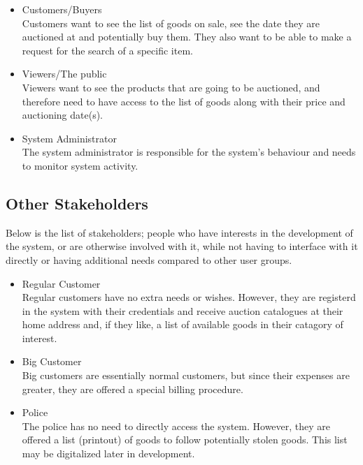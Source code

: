 \begin{itemize}[noitemsep]
	\item Customers/Buyers\\
		Customers want to see the list of goods on sale, see the date they are auctioned at and potentially buy them. They also want to be able to make a request for the search of a specific item.
	\item Viewers/The public\\
		Viewers want to see the products that are going to be auctioned, and therefore need to have access to the list of goods along with their price and auctioning date(s).
	\item System Administrator\\
		The system administrator is responsible for the system's behaviour and needs to monitor system activity.
\end{itemize}

\subsection{Other Stakeholders}
Below is the list of stakeholders; people who have interests in the development of the system, or are otherwise involved with it, while not having to interface with it directly or having additional needs compared to other user groups.
\begin{itemize}[noitemsep]
	\item Regular Customer\\
		Regular customers have no extra needs or wishes. However, they are registerd in the system with their credentials and receive auction catalogues at their home address and, if they like, a list of available goods in their catagory of interest.
	\item Big Customer\\
		Big customers are essentially normal customers, but since their expenses are greater, they are offered a special billing procedure.
	\item Police\\
		The police has no need to directly access the system. However, they are offered a list (printout) of goods to follow potentially stolen goods. This list may be digitalized later in development.
\end{itemize}


